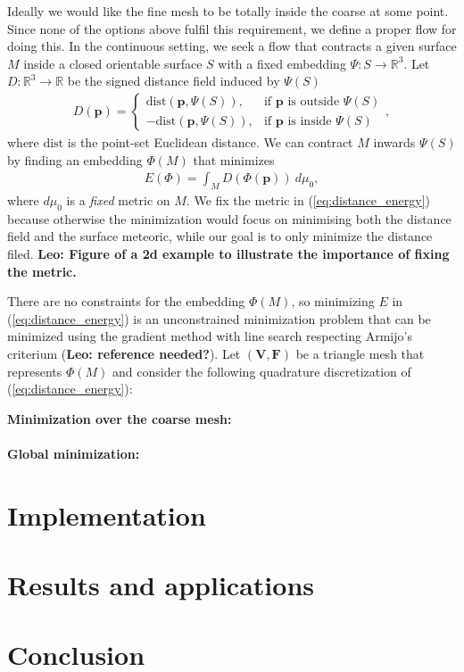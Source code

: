 \documentclass{acmtog}
\newcommand{\leo}[1]{{\bf\textcolor[rgb]{0.9,0.0,0.0}{Leo: #1}}}
\begin{document}
Ideally we would like the fine mesh to be totally inside the coarse at some point. Since none of the options above fulfil this requirement, we define a proper flow for doing this. In the continuous setting, we seek a flow that contracts a given surface $M$ inside a closed orientable surface $S$ with a fixed embedding $\Psi: S \to \mathbb{R}^3$. Let $D: \mathbb{R}^3 \to \mathbb{R}$ be the signed distance field induced by $\Psi(S)$
\begin{align}
D(\mathbf{p}) = \left\{ \begin{array}{rl} 
\mathrm{dist}(\mathbf{p},\Psi(S)), & \mbox{if } \mathbf{p} \mbox{ is outside } \Psi(S) \\
-\mathrm{dist}(\mathbf{p},\Psi(S)), & \mbox{if } \mathbf{p} \mbox{ is inside } \Psi(S)
\end{array}
\right. ,
\end{align}
where $\mathrm{dist}$ is the point-set Euclidean distance. We can contract $M$ inwards $\Psi(S)$ by finding an embedding $\Phi(M)$ that minimizes
\begin{align}
E(\Phi) = \int_M D(\Phi(\mathbf{p}))\ d \mu_0,
\label{eq:distance_energy}
\end{align} 
where $d \mu_0$ is a \emph{fixed} metric on $M$. We fix the metric in (\ref{eq:distance_energy}) because otherwise the minimization would focus on minimising both the distance field and the surface meteoric, while our goal is to only minimize the distance filed. \leo{Figure of a 2d example to illustrate the importance of fixing the metric.}

There are no constraints for the embedding $\Phi(M)$, so minimizing $E$ in (\ref{eq:distance_energy}) is an unconstrained minimization problem that can be minimized using the gradient method with line search respecting Armijo's criterium (\leo{reference needed?}). Let $(\mathbf{V}, \mathbf{F})$ be a triangle mesh that represents $\Phi(M)$ and consider the following quadrature discretization of  (\ref{eq:distance_energy}):

\textbf{Minimization over the coarse mesh:}\\
\\
\textbf{Global minimization:}

\section{Implementation}
\label{sec:implementation}

\section{Results and applications}
\label{sec:results}

\section{Conclusion}
\label{sec:colnclusion}

\begin{acks}
\end{acks}





\end{document}
